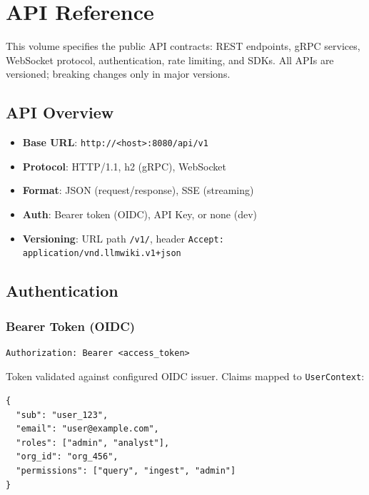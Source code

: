 \chapter{API Reference}
\label{cha:api}

This volume specifies the public API contracts: REST endpoints, gRPC services, WebSocket protocol, authentication, rate limiting, and SDKs. All APIs are versioned; breaking changes only in major versions.

\section{API Overview}
\label{sec:api:overview}

\begin{itemize}
  \item \textbf{Base URL}: \texttt{http://<host>:8080/api/v1}
  \item \textbf{Protocol}: HTTP/1.1, h2 (gRPC), WebSocket
  \item \textbf{Format}: JSON (request/response), SSE (streaming)
  \item \textbf{Auth}: Bearer token (OIDC), API Key, or none (dev)
  \item \textbf{Versioning}: URL path \texttt{/v1/}, header \texttt{Accept: application/vnd.llmwiki.v1+json}
\end{itemize}

\section{Authentication}
\label{sec:api:auth}

\subsection{Bearer Token (OIDC)}
\label{sec:api:oidc}

\begin{verbatim}
Authorization: Bearer <access_token>
\end{verbatim}

Token validated against configured OIDC issuer. Claims mapped to \texttt{UserContext}:
\begin{verbatim}
{
  "sub": "user_123",
  "email": "user@example.com",
  "roles": ["admin", "analyst"],
  "org_id": "org_456",
  "permissions": ["query", "ingest", "admin"]
}
\end{verbatim}

